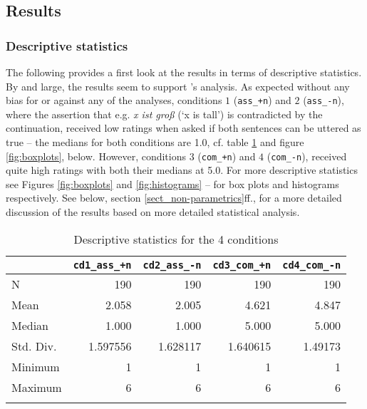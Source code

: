\documentclass[output=paper,
modfonts
]{langscibook}
\begin{document}
\subsection{Results}

\subsubsection{Descriptive statistics}

The following provides a first look at the results in terms of descriptive statistics. By and large, the results seem to support \citeauthor{umbach2009a_comp}'s \citeyearpar{umbach2009a_comp} analysis. As expected without any bias for or against any of the analyses, conditions $1$ (\texttt{ass\_+n}) and $2$ (\texttt{\mbox{ass\_-n}}), where the assertion that e.g. \textit{x ist groß} (`x is tall') is contradicted by the continuation, received low ratings when asked if both sentences can be uttered as true -- the medians for both conditions are 1.0, cf. table \ref{tab:descriptive_stats} and figure \ref{fig:boxplots}, below. However, conditions $3$ (\texttt{com\_+n}) and $4$ (\texttt{com\_-n}), received quite high ratings with both their medians at 5.0. For more descriptive statistics see Figures \ref{fig:boxplots} and \ref{fig:histograms} -- for box plots and histograms respectively. See below, section \ref{sect_non-parametrics}ff., for a more detailed discussion of the results based on more detailed statistical analysis.

\begin{table}[H]
\caption{Descriptive statistics for the 4 conditions}
\label{tab:descriptive_stats}
 \begin{tabular}{lrrrr} 
  \lsptoprule
	   & \texttt{cd1\_ass\_+n}	& \texttt{cd2\_ass\_-n}	& \texttt{cd3\_com\_+n}	& \texttt{cd4\_com\_-n}	\\ 
  \midrule
	N	        & 190		& 190		& 190		& 190		\\
	Mean	    & 2.058		& 2.005		& 4.621		& 4.847		\\
	Median	    & 1.000		& 1.000		& 5.000		& 5.000		\\
    Std. Div.	& 1.597556	& 1.628117	& 1.640615	& 1.49173	\\
	Minimum		& 1 		& 1 		& 1		    & 1		    \\
	Maximum		& 6	    	& 6	    	& 6		    & 6		    \\
  \lspbottomrule
 \end{tabular}
\end{table}
\end{document}

